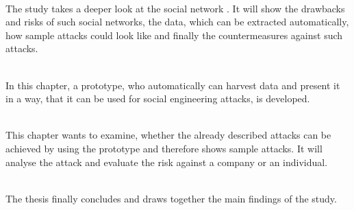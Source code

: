 \vspace{0.5em}\\
\noindent The study takes a deeper look at the social network \Twitter. It will
show the drawbacks and risks of such social networks, the data, which can be
extracted automatically, how sample attacks could look like and finally the
countermeasures against such attacks.

\vspace{0.5em}\\
\noindent In this chapter, a prototype, who automatically can harvest data and
present it in a way, that it can be used for social engineering attacks, is
developed.

\vspace{0.5em}\\
\noindent This chapter wants to examine, whether the already described attacks
can be achieved by using the prototype and therefore shows sample attacks. It
will analyse the attack and evaluate the risk against a company or an
individual.

\vspace{0.5em}\\
\noindent The thesis finally concludes and draws together the main findings of the
study.

\def\chapterautorefname{\oldchapterautorefname}
\newpage


